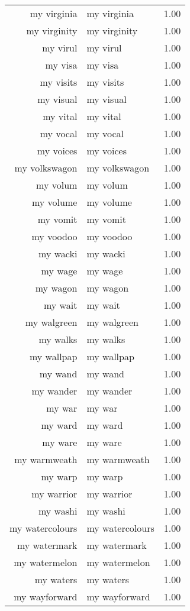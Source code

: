 \begin{table}[ht]
\begin{tabular}{rlr}
  my virginia & my virginia & 1.00 \\ 
  my virginity & my virginity & 1.00 \\ 
  my virul & my virul & 1.00 \\ 
  my visa & my visa & 1.00 \\ 
  my visits & my visits & 1.00 \\ 
  my visual & my visual & 1.00 \\ 
  my vital & my vital & 1.00 \\ 
  my vocal & my vocal & 1.00 \\ 
  my voices & my voices & 1.00 \\ 
  my volkswagon & my volkswagon & 1.00 \\ 
  my volum & my volum & 1.00 \\ 
  my volume & my volume & 1.00 \\ 
  my vomit & my vomit & 1.00 \\ 
  my voodoo & my voodoo & 1.00 \\ 
  my wacki & my wacki & 1.00 \\ 
  my wage & my wage & 1.00 \\ 
  my wagon & my wagon & 1.00 \\ 
  my wait & my wait & 1.00 \\ 
  my walgreen & my walgreen & 1.00 \\ 
  my walks & my walks & 1.00 \\ 
  my wallpap & my wallpap & 1.00 \\ 
  my wand & my wand & 1.00 \\ 
  my wander & my wander & 1.00 \\ 
  my war & my war & 1.00 \\ 
  my ward & my ward & 1.00 \\ 
  my ware & my ware & 1.00 \\ 
  my warmweath & my warmweath & 1.00 \\ 
  my warp & my warp & 1.00 \\ 
  my warrior & my warrior & 1.00 \\ 
  my washi & my washi & 1.00 \\ 
  my watercolours & my watercolours & 1.00 \\ 
  my watermark & my watermark & 1.00 \\ 
  my watermelon & my watermelon & 1.00 \\ 
  my waters & my waters & 1.00 \\ 
  my wayforward & my wayforward & 1.00 \\ 

\end{tabular}
\end{table}
